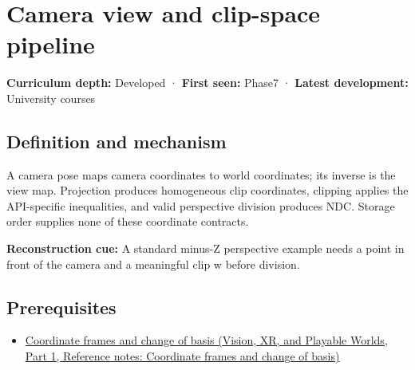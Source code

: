 \hypertarget{appendix-1c07d64f5e70}{}\label{referencestart:appendix-1c07d64f5e70}
\section{Camera view and clip-space pipeline}\label{appendix-1c07d64f5e70-camera-view-and-clip-space-pipeline}

\hypertarget{appendix-1c07d64f5e70-camera-view-and-clip-space-pipeline}{}

\textbf{Curriculum depth:} Developed · \textbf{First seen:} Phase7 · \textbf{Latest development:} University courses

\begin{allmightroledefinition}

\subsection{Definition and mechanism}\label{appendix-1c07d64f5e70-definition-and-mechanism}

\hypertarget{appendix-1c07d64f5e70-definition-and-mechanism}{}

A camera pose maps camera coordinates to world coordinates; its inverse is the view map. Projection produces homogeneous clip coordinates, clipping applies the API-specific inequalities, and valid perspective division produces NDC. Storage order supplies none of these coordinate contracts.

\end{allmightroledefinition}

\textbf{Reconstruction cue:} A standard minus-Z perspective example needs a point in front of the camera and a meaningful clip w before division.

\subsection{Prerequisites}\label{appendix-1c07d64f5e70-prerequisites}

\hypertarget{appendix-1c07d64f5e70-prerequisites}{}

\begin{itemize}
\tightlist
\item
  \href{../07-Vision-XR-and-Playable-Worlds-P01/main.pdf\#nameddest=appendix-1bae9457dbc3}{Coordinate frames and change of basis (Vision, XR, and Playable Worlds, Part 1, Reference notes: Coordinate frames and change of basis)}
\end{itemize}

